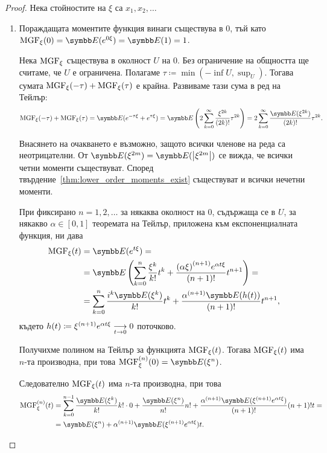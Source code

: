 \documentclass[numbers=endperiod, bibliography=totocnumbered]{scrartcl}
\begin{document}
\begin{proof}
  Нека стойностите на \( \xi \) са \( x_1, x_2, \ldots \)

  \mbox{}
  \begin{enumerate}
    \item Пораждащата моментите функция винаги съществува в \( 0 \), тъй като \( \MGF_\xi(0) = \Expect(e^{0\xi}) = \Expect(1) = 1 \).

    Нека \( \MGF_\xi \) съществува в околност \( U \) на \( 0 \). Без ограничение на общността ще считаме, че \( U \) е ограничена. Полагаме \( \tau \coloneqq \min(-\inf U, \sup_U) \). Тогава сумата \( \MGF_\xi(-\tau) + \MGF_\xi(\tau) \) е крайна. Развиваме тази сума в ред на Тейлър:
    \begin{equation*}
      \MGF_\xi(-\tau) + \MGF_\xi(\tau)
      =
      \Expect(e^{-\tau\xi} + e^{\tau\xi})
      =
      \Expect\left( 2 \sum_{k=0}^\infty \frac {\xi^{2k}} {(2k)!} \tau^{2k} \right)
      =
      2 \sum_{k=0}^\infty \frac {\Expect(\xi^{2k})} {(2k)!} \tau^{2k}.
    \end{equation*}

    Внасянето на очакването е възможно, защото всички членове на реда са неотрицателни. От \( \Expect(\xi^{2m}) = \Expect(\Abs{\xi^{2m}}) \) се вижда, че всички четни моменти съществуват. Според твърдение~\ref{thm:lower_order_moments_exist} съществуват и всички нечетни моменти.

    При фиксирано \( n = 1, 2, \ldots \) за някаква околност на \( 0 \), съдържаща се в \( U \), за някакво \( \alpha \in [0, 1] \) теоремата на Тейлър, приложена към експоненциалната функция, ни дава
    \begin{align*}
      \MGF_\xi(t)
      &=
      \Expect(e^{t\xi})
      = \\ &=
      \Expect\left(\sum_{k=0}^n \frac {\xi^k} {k!} t^k + \frac {{(\alpha \xi)}^{(n+1)} e^{\alpha t \xi}} {(n+1)!} t^{n+1} \right)
      = \\ &=
      \sum_{k=0}^n \frac {i^k \Expect(\xi^k)} {k!} t^k + \frac {{\alpha}^{(n+1)} \Expect(h(t))} {(n+1)!} t^{n+1},
    \end{align*}
    където \( h(t) \coloneqq \xi^{(n+1)} e^{\alpha t \xi} \Conv[t \to 0]{} 0 \) поточково.

    Получихме полином на Тейлър за функцията \( \MGF_\xi(t) \). Тогава \( \MGF_\xi(t) \) има \( n \)-та производна, при това \( \MGF^{(n)}_\xi(0) = \Expect(\xi^n) \).

    Следователно \( \MGF_\xi(t) \) има \( n \)-та производна, при това
    \begin{align*}
      \MGF^{(n)}_\xi(t)
      &=
      \sum_{k=0}^{n-1} \frac {\Expect(\xi^k)} {k!} k! \cdot 0 + \frac {\Expect(\xi^n)} {n!} n! + \frac {\alpha^{(n+1)} \Expect(\xi^{(n+1)} e^{\alpha t \xi})} {(n+1)!} (n+1)! t
      = \\ &=
      \Expect(\xi^n) + \alpha^{(n+1)} \Expect(\xi^{(n+1)} e^{\alpha t \xi}) t.
    \end{align*}


\end{enumerate}
\end{proof}
\end{document}

